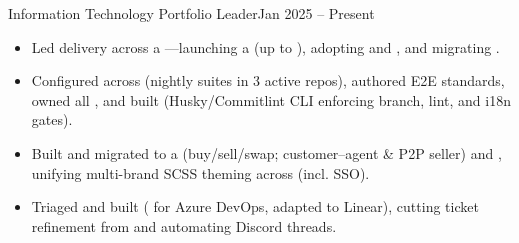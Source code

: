 


\begin{TimelineRole}{Information Technology Portfolio Leader}{Jan 2025 – Present}
    \begin{itemize}
        \item Led delivery across a —launching a  (up to ), adopting  and , and migrating .
        \item Configured  across  (nightly suites in 3 active repos), authored E2E standards, owned all , and built \texttt{} (Husky/Commitlint CLI enforcing branch, lint, and i18n gates).
        \item Built and migrated to  a  (buy/sell/swap; customer–agent \& P2P seller) and , unifying multi-brand SCSS theming across  (incl. SSO).
        \item Triaged  and built \texttt{} ( for Azure DevOps, adapted to Linear), cutting ticket refinement from  and automating Discord threads.
    \end{itemize}
\end{TimelineRole}

